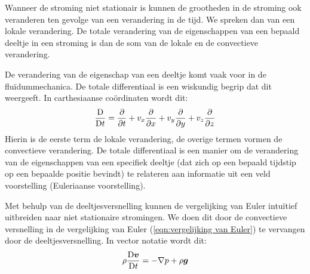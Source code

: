 Wanneer de stroming niet stationair is kunnen de grootheden in de stroming ook veranderen ten gevolge van een verandering in de tijd. We spreken dan van een lokale verandering. De totale verandering van de eigenschappen van een bepaald deeltje in een stroming is dan de som van de lokale en de convectieve verandering.

De verandering van de eigenschap van een deeltje komt vaak voor in de fluïdummechanica. De totale differentiaal is een wiskundig begrip dat dit weergeeft. In carthesiaanse coördinaten wordt dit:
\begin{equation}
	\frac{\mathrm{D}}{\mathrm{D} t} = \frac{\partial}{\partial t} + v_x \frac{\partial}{\partial x} + v_y \frac{\partial}{\partial y} + v_z \frac{\partial}{\partial z}
\end{equation}
Hierin is de eerste term de lokale verandering, de overige termen vormen de convectieve verandering. De totale differentiaal is een manier om de verandering van de eigenschappen van een specifiek deeltje (dat zich op een bepaald tijdstip op een bepaalde positie bevindt) te relateren aan informatie uit een veld voorstelling (Euleriaanse voorstelling).

Met behulp van de deeltjesversnelling kunnen de vergelijking van Euler intuïtief uitbreiden naar niet stationaire stromingen. We doen dit door de convectieve versnelling in de vergelijking van Euler (\ref{eqn:vergelijking van Euler}) te vervangen door de deeltjesversnelling. In vector notatie wordt dit:
\begin{equation}
	\rho \frac{\mathrm{D} \boldsymbol{v}}{\mathrm{D} t} = -\nabla p + \rho \boldsymbol{g}
\end{equation}

